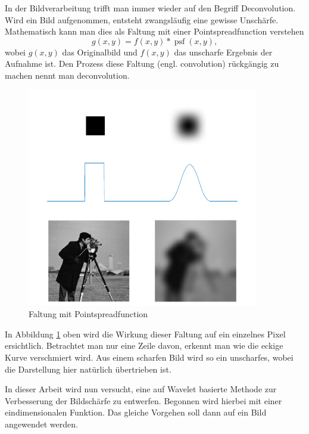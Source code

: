 In der Bildverarbeitung trifft man immer wieder auf den Begriff Deconvolution.
Wird ein Bild aufgenommen, entsteht zwangsläufig eine gewisse Unschärfe.
Mathematisch kann man dies als Faltung mit einer Pointspreadfunction verstehen
$$g(x,y) = f(x,y)*\operatorname{psf}(x,y),$$
wobei $g(x,y)$ das Originalbild und $f(x,y)$ das unscharfe Ergebnis der Aufnahme ist.
Den Prozess diese Faltung (engl. convolution) rückgängig zu machen nennt man deconvolution.
\begin{figure}[h]
\centering
\includegraphics[width=0.9\textwidth]{./papers/deconvolve/pictures/psf.pdf}
\caption{Faltung mit Pointspreadfunction\label{deconvolve:pic}}
\end{figure}

In Abbildung \ref{deconvolve:pic} oben wird die Wirkung dieser Faltung auf ein einzelnes Pixel ersichtlich.
Betrachtet man nur eine Zeile davon, erkennt man wie die eckige Kurve \glqq verschmiert \grqq{} wird.
Aus einem scharfen Bild wird so ein unscharfes, wobei die Darstellung hier natürlich übertrieben ist.

In dieser Arbeit wird nun versucht, eine auf Wavelet basierte Methode zur Verbesserung der Bildschärfe zu entwerfen.
Begonnen wird hierbei mit einer eindimensionalen Funktion.
Das gleiche Vorgehen soll dann auf ein Bild angewendet werden.